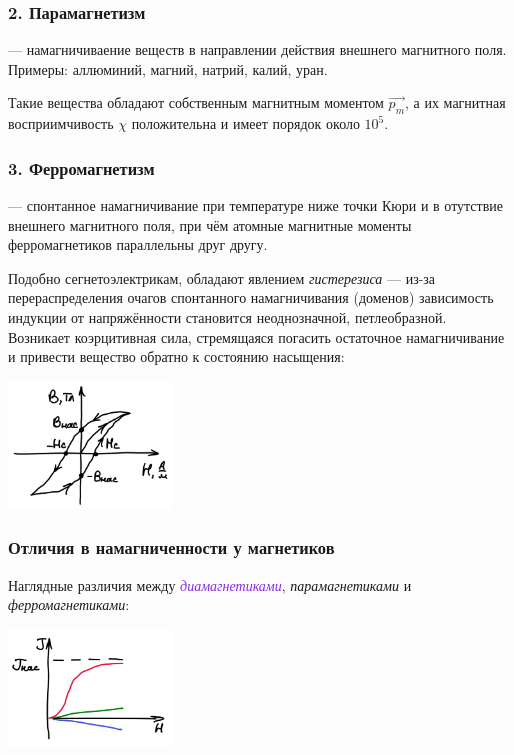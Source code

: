 \documentclass[12pt]{report}
\begin{document}
\subsubsection*{2. Парамагнетизм}
--- намагничиваение веществ в направлении действия внешнего магнитного поля. Примеры:
аллюминий, магний, натрий, калий, уран.

Такие вещества обладают собственным магнитным моментом $\vec{p_m}$,
а их магнитная восприимчивость $\chi$ положительна и имеет порядок около $10^5$.
\subsubsection*{3. Ферромагнетизм}
--- спонтанное намагничивание при температуре ниже точки Кюри и в отутствие внешнего
магнитного поля, при чём атомные магнитные моменты ферромагнетиков параллельны
друг другу.

Подобно сегнетоэлектрикам, обладают явлением \textit{гистерезиса} ---
из-за перераспределения очагов спонтанного намагничивания (доменов)
зависимость индукции от напряжённости становится неоднозначной, петлеобразной.
Возникает коэрцитивная сила, стремящаяся погасить остаточное намагничивание и
привести вещество обратно к состоянию насыщения:
\begin{center}
    \includegraphics[width=0.325\textwidth]{graphics/22_2.png}
\end{center}

\subsubsection*{Отличия в намагниченности у магнетиков}
Наглядные различия между \textit{\textcolor{BlueViolet}{диамагнетиками}},
\textit{\textcolor{OliveGreen}{парамагнетиками}} и
\textit{\textcolor{BrickRed}{ферромагнетиками}}:
\begin{center}
    \includegraphics[width=0.325\textwidth]{graphics/22_3.png}
\end{center}
\end{document}
